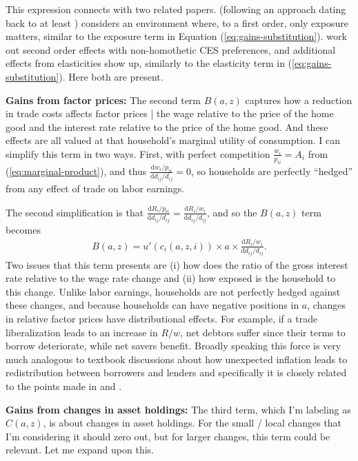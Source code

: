 \documentclass[12pt,pdftex]{article}
\begin{document}
\begin{onehalfspacing}
This expression connects with two related papers. \citet{borusyak2021distributional} (following an approach dating back to at least \citet{deaton1989rice}) considers an environment where, to a first order, only exposure matters, similar to the exposure term in Equation (\ref{eq:gains-substitution}). \citet{auer2022unequal} work out second order effects with non-homothetic CES preferences, and additional effects from elasticities show up, similarly to the elasticity term in (\ref{eq:gains-substitution}). Here both are present.

\textbf{Gains from factor prices:} The second term $B(a,z)$ captures how a reduction in trade costs affects factor prices | the wage relative to the price of the home good and the interest rate relative to the price of the home good. And these effects are all valued at that household's marginal utility of consumption. I can simplify this term in two ways. First, with perfect competition $\frac{w_i}{p_{ii}} = A_{i}$ from (\ref{eq:marginal-product}), and thus $\frac{\mathrm{d} w_{i} / p_{ii}}{\mathrm{d} d_{ij} / d_{ij}} = 0$, so households are perfectly ``hedged'' from any effect of trade on labor earnings.

The second simplification is that $\frac{\mathrm{d} R_{i} / p_{ii}}{\mathrm{d} d_{ij} / d_{ij}} = \frac{\mathrm{d} R_{i} / w_{i}}{\mathrm{d} d_{ij} / d_{ij}}$, and so the $B(a,z)$ term becomes
\begin{align}
B(a,z) = u'(c_{i}(a,z,i)) \times  a \times \frac{\mathrm{d} R_{i} / w_{i}}{\mathrm{d} d_{ij} / d_{ij}}.
\end{align}
Two issues that this term presents are (i) how does the ratio of the gross interest rate relative to the wage rate change and (ii) how exposed is the household to this change. Unlike labor earnings, households are not perfectly hedged against these changes, and because households can have negative positions in $a$, changes in relative factor prices have distributional effects.  For example, if a trade liberalization leads to an increase in $R / w$, net debtors suffer since their terms to borrow deteriorate, while net savers benefit. Broadly speaking this force is very much analogous to textbook discussions about how unexpected inflation leads to redistribution between borrowers and lenders and specifically it is closely related to the points made in \citet{auclert2019monetary} and \citet{moll2022asset}.


\textbf{Gains from changes in asset holdings:} The third term, which I'm labeling as $C(a,z)$, is about changes in asset holdings. For the small / local changes that I'm considering it should zero out, but for larger changes, this term could be relevant. Let me expand upon this.


\end{onehalfspacing}
\end{document}
